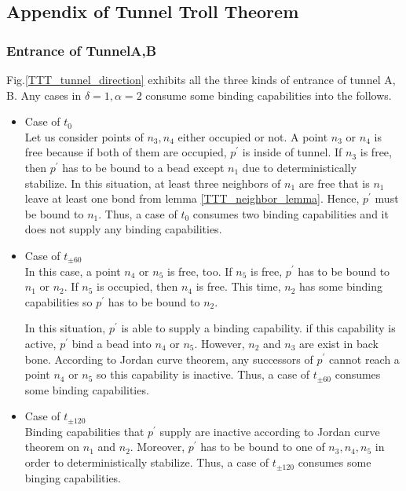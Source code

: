 \documentclass[runningheads]{llncs}
\begin{document}
\subsection{Appendix of Tunnel Troll Theorem}
\subsubsection{Entrance of TunnelA,B}

Fig.\ref{TTT_tunnel_direction} exhibits all the three kinds of entrance of tunnel A, B.
Any cases in $\delta = 1, \alpha = 2$ consume some binding capabilities into the follows.


\begin{itemize}
\item{Case of $t_0$}\\
  Let us consider points of $n_3,n_4$ either occupied or not. A point $n_3$ or $n_4$ is free because if both of them are occupied, $p^\prime$ is inside of tunnel. If $n_3$ is free, then $p^\prime$ has to be bound to a bead except $n_1$ due to deterministically stabilize. In this situation, at least three neighbors of $n_1$ are free that is $n_1$ leave at least one bond from lemma \ref{TTT_neighbor_lemma}. Hence, $p^\prime$ must be bound to $n_1$. Thus, a case of $t_0$ consumes two binding capabilities and it does not supply any binding capabilities.

\item{Case of $t_{\pm 60}$}\\
  In this case, a point $n_4$ or $n_5$ is free, too. If $n_5$ is free, $p^\prime$ has to be bound to $n_1$ or $n_2$. If $n_5$ is occupied, then $n_4$ is free. This time, $n_2$ has some binding capabilities so $p^\prime$ has to be bound to $n_2$.
  

  In this situation, $p^\prime$ is able to supply a binding capability. if this capability is active, $p^\prime$ bind a bead into $n_4$ or $n_5$. However, $n_2$ and $n_3$ are exist in back bone. According to Jordan curve theorem, any successors of $p^\prime$ cannot reach a point $n_4$ or $n_5$ so this capability is inactive. Thus, a case of $t_{\pm 60}$ consumes some binding capabilities.

\item{Case of $t_{\pm 120}$}\\
  Binding capabilities that $p^\prime$ supply are inactive according to Jordan curve theorem on $n_1$ and $n_2$. Moreover, $p^\prime$ has to be bound to one of $n_3, n_4, n_5$ in order to deterministically stabilize.
Thus, a case of $t_{\pm 120}$ consumes some binging capabilities.
  
\end{itemize}
\end{document}
